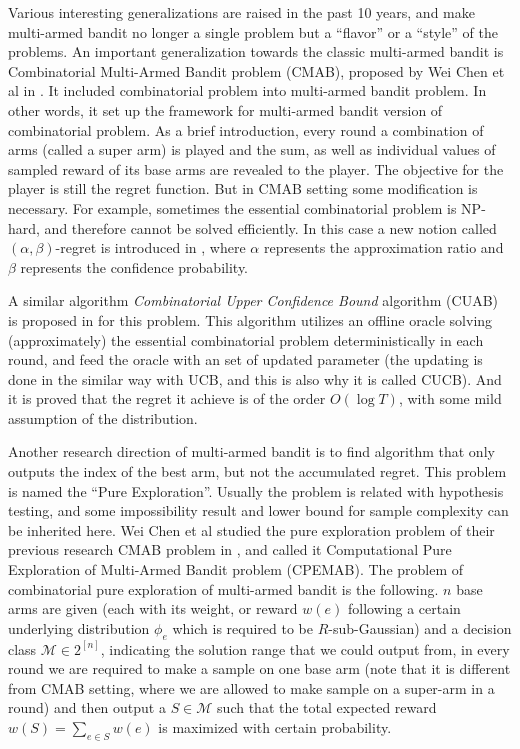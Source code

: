 \documentclass[bachelor]{thuthesis}
\begin{document}
\begin{appendix}
Various interesting generalizations are raised in the past 10 years, and make multi-armed bandit no longer a single problem but a ``flavor'' or a ``style'' of the problems. An important generalization towards the classic multi-armed bandit is Combinatorial Multi-Armed Bandit problem (CMAB), proposed by Wei Chen et al in \cite{cmab}. It included combinatorial problem into multi-armed bandit problem. In other words, it set up the framework for multi-armed bandit version of combinatorial problem. As a brief introduction, every round a combination of arms (called a super arm) is played and the sum, as well as individual values of sampled reward of its base arms are revealed to the player. The objective for the player is still the regret function. But in CMAB setting some modification is necessary. For example, sometimes the essential combinatorial problem is NP-hard, and therefore cannot be solved efficiently. In this case a new notion called $(\alpha,\beta)$-regret is introduced in \cite{cmab}, where $\alpha$ represents the approximation ratio and $\beta$ represents the confidence probability.

A similar algorithm \emph{Combinatorial Upper Confidence Bound} algorithm (CUAB) is proposed in \cite{cmab} for this problem. This algorithm utilizes an offline oracle solving (approximately) the essential combinatorial problem deterministically in each round, and feed the oracle with an set of updated parameter (the updating is done in the similar way with UCB, and this is also why it is called CUCB). And it is proved that the regret it achieve is of the order $O(\log T)$, with some mild assumption of the distribution.

Another research direction of multi-armed bandit is to find algorithm that only outputs the index of the best arm, but not the accumulated regret. This problem is named the ``Pure Exploration''. Usually the problem is related with hypothesis testing, and some impossibility result and lower bound for sample complexity can be inherited here. Wei Chen et al studied the pure exploration problem of their previous research CMAB problem in \cite{cpemab}, and called it Computational Pure Exploration of Multi-Armed Bandit problem (CPEMAB). The problem of combinatorial pure exploration of multi-armed bandit is the following. $n$ base arms are given (each with its weight, or reward $w(e)$ following a certain underlying distribution $\phi_e$ which is required to be $R$-sub-Gaussian) and a decision class $\mathcal{M}\in 2^{[n]}$, indicating the solution range that we could output from, in every round we are required to make a sample on one base arm (note that it is different from CMAB setting, where we are allowed to make sample on a super-arm in a round) and then output a $S\in \mathcal{M}$ such that the total expected reward $w(S)=\sum_{e\in S}w(e)$ is maximized with certain probability.


\end{appendix}
\end{document}
